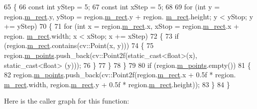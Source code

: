 \begin{DoxyCode}
65     \{
66         \textcolor{keyword}{const} \textcolor{keywordtype}{int} yStep = 5;
67         \textcolor{keyword}{const} \textcolor{keywordtype}{int} xStep = 5;
68 
69         \textcolor{keywordflow}{for} (\textcolor{keywordtype}{int} y = region.\mbox{\hyperlink{class_c_region_a6f68304e90428db829cc38792fa3e1e8}{m\_rect}}.y, yStop = region.\mbox{\hyperlink{class_c_region_a6f68304e90428db829cc38792fa3e1e8}{m\_rect}}.y + region.
      \mbox{\hyperlink{class_c_region_a6f68304e90428db829cc38792fa3e1e8}{m\_rect}}.height; y < yStop; y += yStep)
70         \{
71             \textcolor{keywordflow}{for} (\textcolor{keywordtype}{int} x = region.\mbox{\hyperlink{class_c_region_a6f68304e90428db829cc38792fa3e1e8}{m\_rect}}.x, xStop = region.\mbox{\hyperlink{class_c_region_a6f68304e90428db829cc38792fa3e1e8}{m\_rect}}.x + region.
      \mbox{\hyperlink{class_c_region_a6f68304e90428db829cc38792fa3e1e8}{m\_rect}}.width; x < xStop; x += xStep)
72             \{
73                 \textcolor{keywordflow}{if} (region.\mbox{\hyperlink{class_c_region_a6f68304e90428db829cc38792fa3e1e8}{m\_rect}}.contains(cv::Point(x, y)))
74                 \{
75                     region.\mbox{\hyperlink{class_c_region_a65be08ae81a8d174d95ae35a2f7fb212}{m\_points}}.push\_back(cv::Point2f(static\_cast<float>(x), static\_cast<float>
      (y)));
76                 \}
77             \}
78         \}
79 
80         \textcolor{keywordflow}{if} (region.\mbox{\hyperlink{class_c_region_a65be08ae81a8d174d95ae35a2f7fb212}{m\_points}}.empty())
81         \{
82             region.\mbox{\hyperlink{class_c_region_a65be08ae81a8d174d95ae35a2f7fb212}{m\_points}}.push\_back(cv::Point2f(region.\mbox{\hyperlink{class_c_region_a6f68304e90428db829cc38792fa3e1e8}{m\_rect}}.x + 0.5f * region.
      \mbox{\hyperlink{class_c_region_a6f68304e90428db829cc38792fa3e1e8}{m\_rect}}.width, region.\mbox{\hyperlink{class_c_region_a6f68304e90428db829cc38792fa3e1e8}{m\_rect}}.y + 0.5f * region.\mbox{\hyperlink{class_c_region_a6f68304e90428db829cc38792fa3e1e8}{m\_rect}}.height));
83         \}
84     \}
\end{DoxyCode}
Here is the caller graph for this function\+:\nopagebreak

